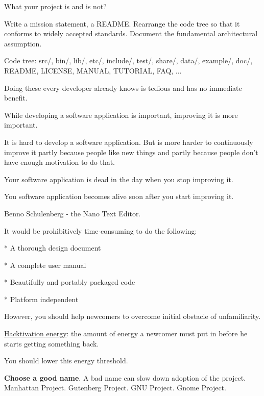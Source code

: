 \documentclass[landscape,30pt]{foils}
\begin{document}
What your project is and is not?

Write a mission statement, a README.  Rearrange the code tree so that it conforms to widely accepted standards.  Document the  fundamental architectural assumption.

Code tree: src/, bin/, lib/, etc/, include/, test/, share/, data/, example/, doc/, README, LICENSE, MANUAL, TUTORIAL, FAQ, ...

Doing these every developer already knows is tedious and has no immediate benefit.



While developing a software application is important, improving it is
more important.

It is hard to develop a software application. But is more harder to
continuously improve it partly because people like new things and
partly because people don't have enough motivation to do that.

Your software application is dead in the day when you stop improving
it.

You software application becomes alive soon after you start improving
it.

Benno Schulenberg - the Nano Text Editor.



It would be prohibitively time-consuming to do the following:

* A thorough design document

* A complete user manual

* Beautifully and portably packaged code

* Platform independent

However, you should help newcomers to overcome initial obstacle of unfamiliarity.

\underline{Hacktivation energy}: the amount of energy a newcomer must put in before he starts getting something back.

You should lower this energy threshold.


{\bf Choose a good name}.   A bad name can slow down adoption of the project.  Manhattan Project. Gutenberg Project. GNU Project. Gnome Project.
\end{document}
